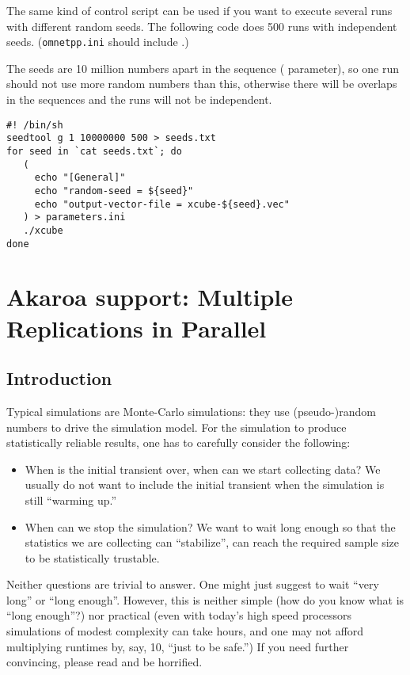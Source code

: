 The same kind of control script can be used if you want to execute
several runs with different random seeds.
The following code does 500 runs with independent seeds.
(\texttt{omnetpp.ini} should include .)

The seeds are 10 million numbers apart in the sequence (
parameter), so one run should not use more random numbers than this,
otherwise there will be overlaps in the sequences and the runs
will not be independent.

\begin{verbatim}
#! /bin/sh
seedtool g 1 10000000 500 > seeds.txt
for seed in `cat seeds.txt`; do
   (
     echo "[General]"
     echo "random-seed = ${seed}"
     echo "output-vector-file = xcube-${seed}.vec"
   ) > parameters.ini
   ./xcube
done
\end{verbatim}





\section{Akaroa support: Multiple Replications in Parallel}
\label{sec:ch-run-sim:akaroa}

\subsection{Introduction}

Typical simulations are Monte-Carlo simulations: they use
(pseudo-)random numbers to drive the simulation model.
For the simulation to produce statistically reliable results,
one has to carefully consider the following:

\begin{itemize}
  \item{When is the initial transient over, when can we start
    collecting data? We usually do not want to include the
    initial transient when the simulation is still ``warming up.''}
  \item{When can we stop the simulation? We want to wait long enough
    so that the statistics we are collecting can ``stabilize'',
    can reach the required sample size to be statistically trustable.}
\end{itemize}

Neither questions are trivial to answer. One might just suggest
to wait ``very long'' or ``long enough''. However, this is neither
simple (how do you know what is ``long enough''?) nor practical
(even with today's high speed processors simulations of modest complexity
can take hours, and one may not afford multiplying runtimes by,
say, 10, ``just to be safe.'') If you need further convincing,
please read \cite{Pawlikowsky02} and be horrified.

